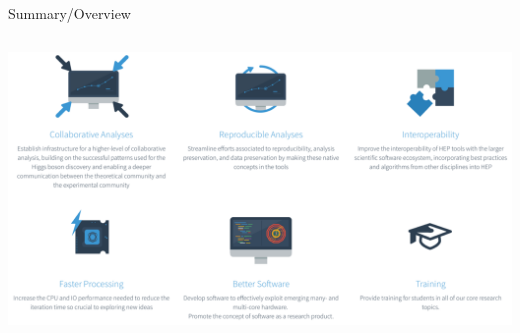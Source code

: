 \documentclass{beamer}
\begin{document}
\begin{frame}{Summary/Overview}
\vspace{0.5 cm}
\begin{columns}
\includegraphics[width=\linewidth]{diana_goals.png}
\end{columns}
\end{frame}
\end{document}
